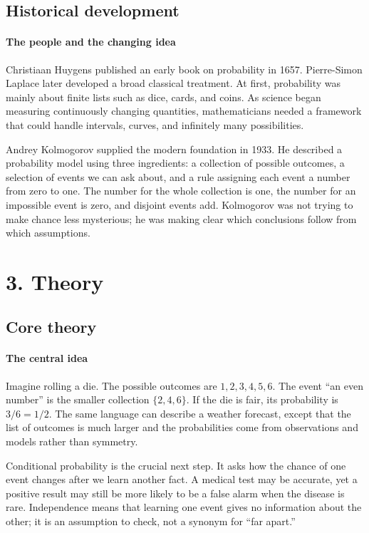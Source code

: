 \subsection*{Historical development}
\begin{historylist}
\paragraph{The people and the changing idea}
Christiaan Huygens published an early book on probability in 1657. Pierre-Simon Laplace later developed a broad classical treatment. At first, probability was mainly about finite lists such as dice, cards, and coins. As science began measuring continuously changing quantities, mathematicians needed a framework that could handle intervals, curves, and infinitely many possibilities.

Andrey Kolmogorov supplied the modern foundation in 1933. He described a probability model using three ingredients: a collection of possible outcomes, a selection of events we can ask about, and a rule assigning each event a number from zero to one. The number for the whole collection is one, the number for an impossible event is zero, and disjoint events add. Kolmogorov was not trying to make chance less mysterious; he was making clear which conclusions follow from which assumptions.

\end{historylist}
\section*{3. Theory}
\subsection*{Core theory}
\paragraph{The central idea}
Imagine rolling a die. The possible outcomes are $1,2,3,4,5,6$. The event ``an even number'' is the smaller collection $\{2,4,6\}$. If the die is fair, its probability is $3/6=1/2$. The same language can describe a weather forecast, except that the list of outcomes is much larger and the probabilities come from observations and models rather than symmetry.

Conditional probability is the crucial next step. It asks how the chance of one event changes after we learn another fact. A medical test may be accurate, yet a positive result may still be more likely to be a false alarm when the disease is rare. Independence means that learning one event gives no information about the other; it is an assumption to check, not a synonym for ``far apart.''

